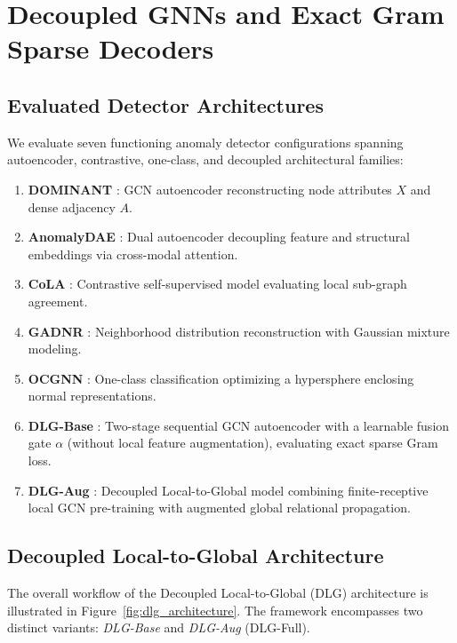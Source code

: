 \documentclass[11pt,a4paper]{article}
\begin{document}
\section{Decoupled GNNs and Exact Gram Sparse Decoders}
\label{sec:models}

\subsection{Evaluated Detector Architectures}
We evaluate seven functioning anomaly detector configurations spanning autoencoder, contrastive, one-class, and decoupled architectural families:
\begin{enumerate}
    \item \textbf{DOMINANT} \cite{ding2019deep}: GCN autoencoder reconstructing node attributes $X$ and dense adjacency $A$.
    \item \textbf{AnomalyDAE} \cite{fan2020anomalydae}: Dual autoencoder decoupling feature and structural embeddings via cross-modal attention.
    \item \textbf{CoLA} \cite{liu2022cola}: Contrastive self-supervised model evaluating local sub-graph agreement.
    \item \textbf{GADNR} \cite{roy2024gadnr}: Neighborhood distribution reconstruction with Gaussian mixture modeling.
    \item \textbf{OCGNN} \cite{wang2021ocgnn}: One-class classification optimizing a hypersphere enclosing normal representations.
    \item \textbf{DLG-Base} \cite{park2026dlg}: Two-stage sequential GCN autoencoder with a learnable fusion gate $\alpha$ (without local feature augmentation), evaluating exact sparse Gram loss.
    \item \textbf{DLG-Aug} \cite{park2026dlg}: Decoupled Local-to-Global model combining finite-receptive local GCN pre-training with augmented global relational propagation.
\end{enumerate}

\subsection{Decoupled Local-to-Global Architecture}
The overall workflow of the Decoupled Local-to-Global (DLG) architecture is illustrated in Figure~\ref{fig:dlg_architecture}. The framework encompasses two distinct variants: \textit{DLG-Base} and \textit{DLG-Aug} (DLG-Full).
\end{document}
